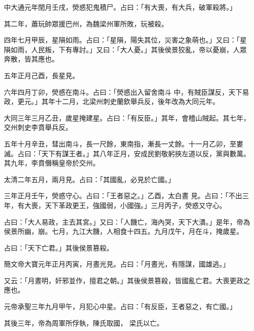 \begin{pinyinscope}
 中大通元年閏月壬戌，熒惑犯鬼積尸。占曰：「有大喪，有大兵，破軍殺將。」



 其二年，蕭玩帥眾援巴州，為魏梁州軍所敗，玩被殺。



 四年七月甲辰，星隕如雨。占曰：「星隕，陽失其位，災害之象萌也。」又曰：「星隕如雨，人民叛，下有專討。」又曰：「大人憂。」其後侯景狡亂，帝以憂崩，人眾奔散，皆其應也。



 五年正月己酉，長星見。



 六年四月丁卯，熒惑在南斗。占曰：「熒惑出入留舍南斗
 中，有賊臣謀反，天下易政，更元。」其年十二月，北梁州刺史蘭欽舉兵反，後年改為大同元年。



 大同三年三月乙丑，歲星掩建星。占曰：「有反臣。」其年，會稽山賊起。其七年，交州刺史李賁舉兵反。



 五年十月辛丑，彗出南斗，長一尺餘，東南指，漸長一丈餘。十一月乙卯，至婁滅。占曰：「天下有謀王者。」其八年正月，安成民劉敬躬挾左道以反，黨與數萬。其九年，李賁僭稱皇帝於交州。



 太清二年五月，兩月見。占曰：「其國亂，必見於亡國。」



 三年正月壬午，熒惑守心。占曰：「王者惡之。」乙酉，太白晝
 見。占曰：「不出三年，有大喪，天下革政更王，強國弱，小國強。」三月丙子，熒惑又守心。



 占曰：「大人易政，主去其宮。」又曰：「人饑亡，海內哭，天下大潰。」是年，帝為侯景所幽，崩。七月，九江大饑，人相食十四五。九月戊午，月在斗，掩歲星。



 占曰：「天下亡君。」其後侯景篡殺。



 簡文帝大寶元年正月丙寅，月晝光見。占曰：「月晝光，有隱謀，國雄逃。」



 又云：「月晝明，奸邪並作，擅君之朝。」其後侯景篡殺，皆國亂亡君。大喪更政之應也。



 元帝承聖三年九月甲午，月犯心中星。占曰：「有反臣，王者惡之，有亡國。」



 其後三年，帝為周軍所俘執，陳氏取國，
 梁氏以亡。




\end{pinyinscope}
